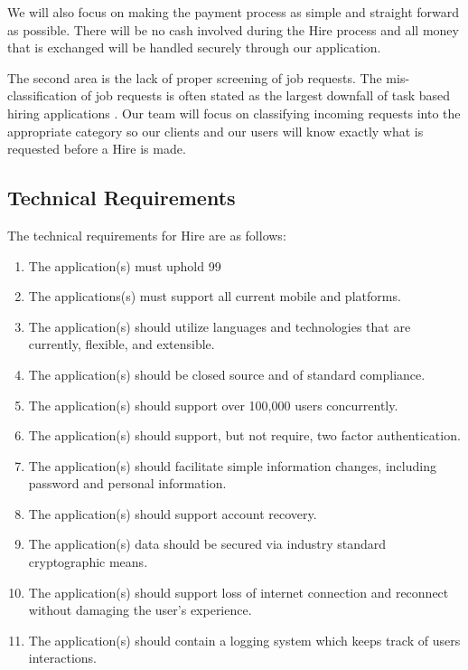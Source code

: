 \documentclass[11pt]{article}
\begin{document}
We will also focus on making the payment process as simple and straight forward as possible. 
There will be no cash involved during the Hire process and all money that is exchanged will be handled securely through our application.

The second area is the lack of proper screening of job requests. 
The mis-classification of job requests is often stated as the largest downfall of task based hiring applications \cite{ThumbTack_sucks}. 
Our team will focus on classifying incoming requests into the appropriate category so our clients and our users will know exactly what is requested before a Hire is made.

\subsection{Technical Requirements}

The technical requirements for Hire are as follows:

\begin{enumerate}
	\item The application(s) must uphold 99%
	\item The applications(s) must support all current mobile and platforms.
	\item The application(s) should utilize languages and technologies that are currently, flexible, and extensible.
	\item The application(s) should be closed source and of standard compliance.
	\item The application(s) should support over 100,000 users concurrently.
	\item The application(s) should support, but not require, two factor authentication.
	\item The application(s) should facilitate simple information changes, including password and personal information.
	\item The application(s) should support account recovery.
	\item The application(s) data should be secured via industry standard cryptographic means.
	\item The application(s) should support loss of internet connection and reconnect without damaging the user's experience.
	\item The application(s) should contain a logging system which keeps track of users interactions.
\end{enumerate}
\end{document}
